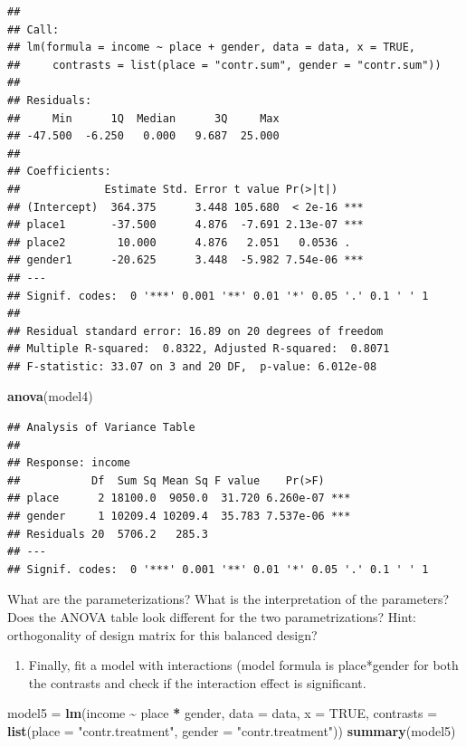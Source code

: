 \documentclass[
]{article}
\newenvironment{Shaded}{\begin{snugshade}}{\end{snugshade}}
\newcommand{\AttributeTok}[1]{\textcolor[rgb]{0.13,0.29,0.53}{#1}}
\newcommand{\ConstantTok}[1]{\textcolor[rgb]{0.56,0.35,0.01}{#1}}
\newcommand{\FunctionTok}[1]{\textcolor[rgb]{0.13,0.29,0.53}{\textbf{#1}}}
\newcommand{\NormalTok}[1]{#1}
\newcommand{\OtherTok}[1]{\textcolor[rgb]{0.56,0.35,0.01}{#1}}
\newcommand{\SpecialCharTok}[1]{\textcolor[rgb]{0.81,0.36,0.00}{\textbf{#1}}}
\newcommand{\StringTok}[1]{\textcolor[rgb]{0.31,0.60,0.02}{#1}}
\providecommand{\tightlist}{%
  \setlength{\itemsep}{0pt}\setlength{\parskip}{0pt}}
\begin{document}
\begin{verbatim}
## 
## Call:
## lm(formula = income ~ place + gender, data = data, x = TRUE, 
##     contrasts = list(place = "contr.sum", gender = "contr.sum"))
## 
## Residuals:
##     Min      1Q  Median      3Q     Max 
## -47.500  -6.250   0.000   9.687  25.000 
## 
## Coefficients:
##             Estimate Std. Error t value Pr(>|t|)    
## (Intercept)  364.375      3.448 105.680  < 2e-16 ***
## place1       -37.500      4.876  -7.691 2.13e-07 ***
## place2        10.000      4.876   2.051   0.0536 .  
## gender1      -20.625      3.448  -5.982 7.54e-06 ***
## ---
## Signif. codes:  0 '***' 0.001 '**' 0.01 '*' 0.05 '.' 0.1 ' ' 1
## 
## Residual standard error: 16.89 on 20 degrees of freedom
## Multiple R-squared:  0.8322, Adjusted R-squared:  0.8071 
## F-statistic: 33.07 on 3 and 20 DF,  p-value: 6.012e-08
\end{verbatim}

\begin{Shaded}
\begin{Highlighting}[]
\FunctionTok{anova}\NormalTok{(model4)}
\end{Highlighting}
\end{Shaded}

\begin{verbatim}
## Analysis of Variance Table
## 
## Response: income
##           Df  Sum Sq Mean Sq F value    Pr(>F)    
## place      2 18100.0  9050.0  31.720 6.260e-07 ***
## gender     1 10209.4 10209.4  35.783 7.537e-06 ***
## Residuals 20  5706.2   285.3                      
## ---
## Signif. codes:  0 '***' 0.001 '**' 0.01 '*' 0.05 '.' 0.1 ' ' 1
\end{verbatim}

What are the parameterizations? What is the interpretation of the
parameters? Does the ANOVA table look different for the two
parametrizations? Hint: orthogonality of design matrix for this balanced
design?

\begin{enumerate}
\def\labelenumi{\arabic{enumi}.}
\setcounter{enumi}{5}
\tightlist
\item
  Finally, fit a model with interactions (model formula is place*gender
  for both the contrasts and check if the interaction effect is
  significant.
\end{enumerate}

\begin{Shaded}
\begin{Highlighting}[]
\NormalTok{model5 }\OtherTok{=} \FunctionTok{lm}\NormalTok{(income }\SpecialCharTok{\textasciitilde{}}\NormalTok{ place }\SpecialCharTok{*}\NormalTok{ gender, }\AttributeTok{data =}\NormalTok{ data, }\AttributeTok{x =} \ConstantTok{TRUE}\NormalTok{, }\AttributeTok{contrasts =} \FunctionTok{list}\NormalTok{(}\AttributeTok{place =} \StringTok{"contr.treatment"}\NormalTok{,}
    \AttributeTok{gender =} \StringTok{"contr.treatment"}\NormalTok{))}
\FunctionTok{summary}\NormalTok{(model5)}
\end{Highlighting}
\end{Shaded}
\end{document}
